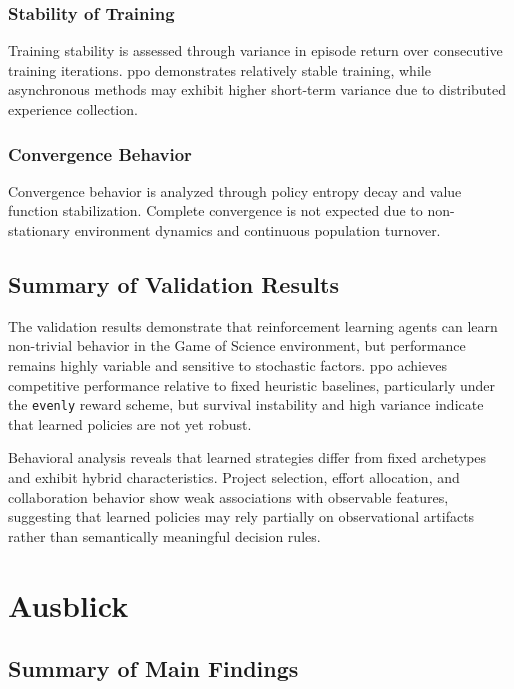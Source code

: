 \documentclass[english,bachelor]{hsluthesis}
\begin{document}
\subsection{Stability of Training}
Training stability is assessed through variance in episode return over consecutive training iterations. \gls{ppo} demonstrates relatively stable training, while asynchronous methods may exhibit higher short-term variance due to distributed experience collection.

\subsection{Convergence Behavior}
Convergence behavior is analyzed through policy entropy decay and value function stabilization. Complete convergence is not expected due to non-stationary environment dynamics and continuous population turnover.

\section{Summary of Validation Results}

The validation results demonstrate that reinforcement learning agents can learn non-trivial behavior in the Game of Science environment, but performance remains highly variable and sensitive to stochastic factors. \gls{ppo} achieves competitive performance relative to fixed heuristic baselines, particularly under the \texttt{evenly} reward scheme, but survival instability and high variance indicate that learned policies are not yet robust.

Behavioral analysis reveals that learned strategies differ from fixed archetypes and exhibit hybrid characteristics. Project selection, effort allocation, and collaboration behavior show weak associations with observable features, suggesting that learned policies may rely partially on observational artifacts rather than semantically meaningful decision rules.

\chapter{Ausblick}

\section{Summary of Main Findings}
\end{document}

